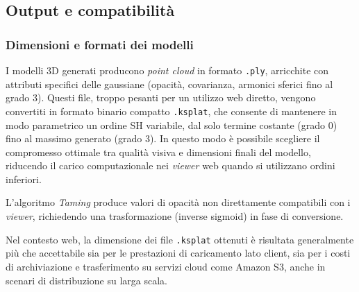 \subsection{Output e compatibilità}
\subsubsection{Dimensioni e formati dei modelli}
I modelli 3D generati producono \emph{point cloud} in formato \texttt{.ply}, arricchite con attributi specifici delle gaussiane (opacità, covarianza, armonici sferici fino al grado 3).  
Questi file, troppo pesanti per un utilizzo web diretto, vengono convertiti in formato binario compatto \texttt{.ksplat}, che consente di mantenere in modo parametrico un ordine SH variabile, dal solo termine costante (grado 0) fino al massimo generato (grado 3).  
In questo modo è possibile scegliere il compromesso ottimale tra qualità visiva e dimensioni finali del modello, riducendo il carico computazionale nei \emph{viewer} web quando si utilizzano ordini inferiori.

L'algoritmo \emph{Taming} produce valori di opacità non direttamente compatibili con i \emph{viewer}, richiedendo una trasformazione (inverse sigmoid) in fase di conversione.  

Nel contesto web, la dimensione dei file \texttt{.ksplat} ottenuti è risultata generalmente più che accettabile sia per le prestazioni di caricamento lato client, sia per i costi di archiviazione e trasferimento su servizi cloud come Amazon S3, anche in scenari di distribuzione su larga scala.

